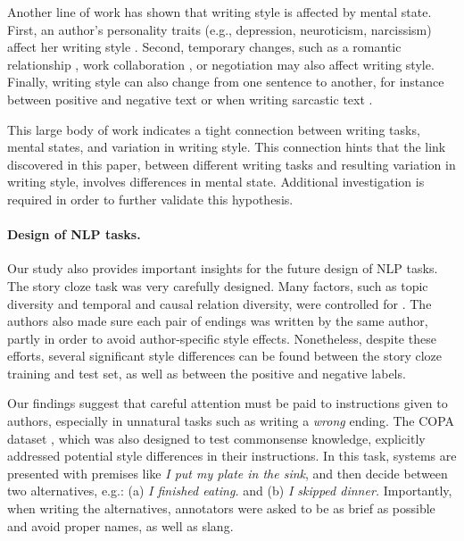 \documentclass[11pt,a4paper]{article}
\begin{document}
Another line of work has shown that writing style is affected by mental state.
First, an author's personality traits (e.g., depression, neuroticism, narcissism) affect her writing style \cite{schwartz2013personality,Ireland:2014b}.
Second, temporary changes, such as a romantic relationship \cite{Ireland:2011,Bowen:2016}, work collaboration \cite{Tausczik:2009,Gonzales:2009}, or negotiation \cite{Ireland:2014} may also affect writing style.
Finally, writing style can also change from one sentence to another, for instance between positive and negative text \cite{Davidov:2010} or when writing sarcastic text \cite{Tsur:2010}. 

This large body of work indicates a tight connection between writing
tasks, mental states, and variation in writing style.
This connection hints that the link discovered in this paper, between
different writing tasks and resulting variation in writing style,
involves differences in mental state. 
Additional investigation is required in order to further validate this hypothesis.


\paragraph{Design of NLP tasks.}
Our study also provides important insights for the future design of NLP tasks. 
The story cloze task was very carefully designed. Many factors, such
as topic diversity and temporal and causal relation diversity,  were controlled for \cite{Mostafazadeh:2016}. 
The authors also made sure each pair of endings was written by the
same author, partly in order to avoid author-specific style effects.
 Nonetheless, despite these efforts, several significant style
 differences can be found between the story cloze training and test set, as well as between the positive and negative labels. 
 
Our findings suggest that careful attention must be paid to instructions given to authors, especially in unnatural tasks such as writing a {\it wrong} ending. 
The COPA dataset \cite{Roemmele:2011}, which was also designed to test commonsense knowledge, explicitly addressed potential style differences in their instructions. In this task,  systems are presented with premises like {\it I put my plate in the sink}, and then decide between two alternatives, e.g.: (a) {\it I finished eating.} and (b) {\it I skipped dinner.}
Importantly, when writing the alternatives,  annotators were asked to be as brief as possible and avoid proper names, as well as  slang. 
\end{document}
